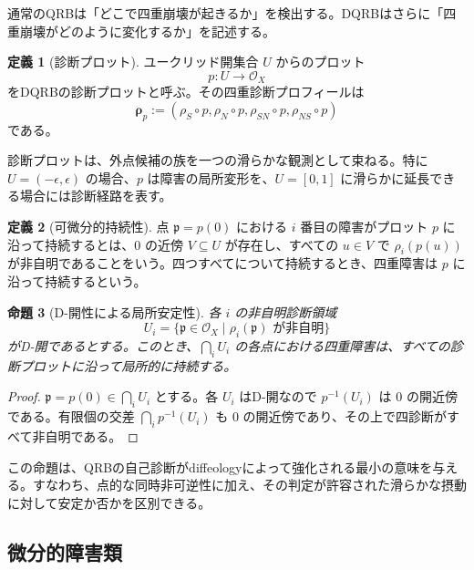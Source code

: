 \documentclass[a4paper,11pt]{ltjsarticle}
\theoremstyle{definition}
\newtheorem{definition}{定義}[section]
\theoremstyle{plain}
\newtheorem{proposition}[definition]{命題}
\begin{document}
通常のQRBは「どこで四重崩壊が起きるか」を検出する。DQRBはさらに「四重崩壊がどのように変化するか」を記述する。

\begin{definition}[診断プロット]
ユークリッド開集合 $U$ からのプロット
\begin{equation}
 p:U\longrightarrow\mathcal O_X
 \end{equation}
をDQRBの診断プロットと呼ぶ。その四重診断プロフィールは
\begin{equation}
 \boldsymbol\rho_p
 :=(\rho_S\circ p,\rho_N\circ p,
 \rho_{SN}\circ p,\rho_{NS}\circ p)
 \label{eq:profile}
\end{equation}
である。
\end{definition}

診断プロットは、外点候補の族を一つの滑らかな観測として束ねる。特に $U=(-\epsilon,\epsilon)$ の場合、$p$ は障害の局所変形を、$U=[0,1]$ に滑らかに延長できる場合には診断経路を表す。

\begin{definition}[可微分的持続性]
点 $\mathfrak p=p(0)$ における $i$ 番目の障害がプロット $p$ に沿って持続するとは、$0$ の近傍 $V\subseteq U$ が存在し、すべての $u\in V$ で $\rho_i(p(u))$ が非自明であることをいう。四つすべてについて持続するとき、四重障害は $p$ に沿って持続するという。
\end{definition}

\begin{proposition}[D-開性による局所安定性]
各 $i$ の非自明診断領域
\begin{equation}
 U_i=\{\mathfrak p\in\mathcal O_X
 \mid \rho_i(\mathfrak p)\text{ が非自明}\}
 \end{equation}
がD-開であるとする。このとき、$\bigcap_iU_i$ の各点における四重障害は、すべての診断プロットに沿って局所的に持続する。
\end{proposition}

\begin{proof}
$\mathfrak p=p(0)\in\bigcap_iU_i$ とする。各 $U_i$ はD-開なので $p^{-1}(U_i)$ は $0$ の開近傍である。有限個の交差 $\bigcap_i p^{-1}(U_i)$ も $0$ の開近傍であり、その上で四診断がすべて非自明である。
\end{proof}

この命題は、QRBの自己診断がdiffeologyによって強化される最小の意味を与える。すなわち、点的な同時非可逆性に加え、その判定が許容された滑らかな摂動に対して安定か否かを区別できる。

\subsection{微分的障害類}
\end{document}
